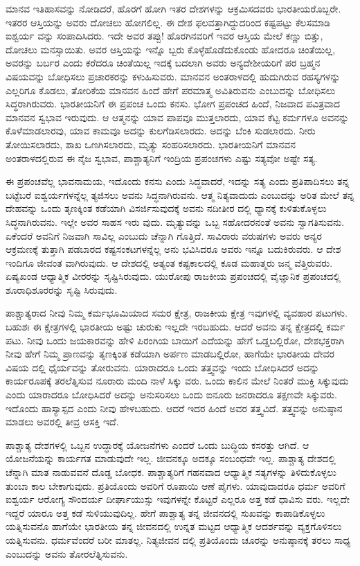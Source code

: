 ಮಾನವ ಇತಿಹಾಸವನ್ನು ನೋಡಿದರೆ, ಹೊರಗೆ ಹೋಗಿ ಇತರ ದೇಶಗಳನ್ನು ಆಕ್ರಮಿಸದವರು ಭಾರತೀಯರೊಬ್ಬರೇ. ಇತರರ ಆಸ್ತಿಯನ್ನು ಅವರು ದೋಚಲು ಹೋಗಲಿಲ್ಲ. ಈ ದೇಶ ಫಲವತ್ತಾಗಿದ್ದುದರಿಂದ ಕಷ್ಟಪಟ್ಟು ಕೆಲಸಮಾಡಿ ಐಶ್ವರ್ಯ ವನ್ನು ಸಂಪಾದಿಸಿದರು. ಇದೇ ಅವರ ತಪ್ಪು! ಹೊರಗಿನವರಿಗೆ ಇವರ ಆಸ್ತಿಯ ಮೇಲೆ ಕಣ್ಣು ಬಿತ್ತು, ದೋಚಲು ಮನಸ್ಸಾಯಿತು. ಅವರ ಆಸ್ತಿಯನ್ನು ಇನ್ನೊ ಬ್ಬರು ಕೊಳ್ಳೆಹೊಡೆದುಕೊಂಡು ಹೋದರೂ ಚಿಂತೆಯಿಲ್ಲ, ಅವರನ್ನು ಬರ್ಬರ ಎಂದು ಕರೆದರೂ ಚಿಂತೆಯಿಲ್ಲ ಇದಕ್ಕೆ ಬದಲಾಗಿ ಅವರು ಅನ್ಯದೇಶೀಯರಿಗೆ ಪರ ಬ್ರಹ್ಮನ ವಿಷಯವನ್ನು ಬೋಧಿಸಲು ಪ್ರಚಾರಕರನ್ನು ಕಳುಹಿಸುವರು. ಮಾನವನ ಅಂತರಾಳದಲ್ಲಿ ಹುದುಗಿರುವ ರಹಸ್ಯಗಳನ್ನು ಎಲ್ಲರಿಗೂ ಕೊಡಲು, ತೋರಿಕೆಯ ಮಾನವನ ಹಿಂದೆ ಹೇಗೆ ಪರಮಾತ್ಮ ಅವಿತಿರುವನು ಎಂಬುದನ್ನು ಬೋಧಿಸಲು ಸಿದ್ಧರಾಗಿರುವರು. ಭಾರತೀಯನಿಗೆ ಈ ಪ್ರಪಂಚ ಒಂದು ಕನಸು. ಭೋಗ ಪ್ರಪಂಚದ ಹಿಂದೆ, ನಿಜವಾದ ಪವಿತ್ರವಾದ ಮಾನವನ ಸ್ವಭಾವ ಇರುವುದು. ಆ ಆತ್ಮನನ್ನು ಯಾವ ಪಾಪವೂ ಮುತ್ತಲಾರದು, ಯಾವ ಕೆಟ್ಟ ಕರ್ಮಗಳೂ ಅವನನ್ನು ಕೊಳೆಮಾಡಲಾರವು, ಯಾವ ಕಾಮವೂ ಅದನ್ನು ಕುಲಗೆಡಿಸಲಾರದು. ಅದನ್ನು ಬೆಂಕಿ ಸುಡಲಾರದು. ನೀರು ತೋಯಿಸಲಾರದು, ಶಾಖ ಒಣಗಿಸಲಾರದು, ಮೃತ್ಯು ಸಂಹರಿಸಲಾರದು. ಭಾರತೀಯನಿಗೆ ಮಾನವನ ಅಂತರಾಳದಲ್ಲಿರುವ ಈ ನೈಜ ಸ್ವಭಾವ, ಪಾಶ್ಚಾತ್ಯನಿಗೆ ಇಂದ್ರಿಯ ಪ್ರಪಂಚಗಳು ಎಷ್ಟು ಸತ್ಯವೋ ಅಷ್ಟೇ ಸತ್ಯ.

ಈ ಪ್ರಪಂಚವೆಲ್ಲ ಭಾವನಾಮಯ, ಇದೊಂದು ಕನಸು ಎಂದು ಸಿದ್ಧವಾದರೆ, ಇದನ್ನು ಸತ್ಯ ಎಂದು ಪ್ರತಿಪಾದಿಸಲು ತನ್ನ ಬಟ್ಟೆಬರೆ ಐಶ್ವರ್ಯಗಳನ್ನೆಲ್ಲ ತ್ಯಜಿಸಲು ಅವನು ಸಿದ್ಧನಾಗಿರುವನು. ಆತ್ಮ ನಿತ್ಯವಾದುದು ಎಂಬುದನ್ನು ಅರಿತ ಮೇಲೆ ತನ್ನ ದೇಹವನ್ನು ಒಂದು ತೃಣಕ್ಕಿಂತ ಕಡೆಯಾಗಿ ವಿಸರ್ಜಿಸುವುದಕ್ಕೆ ಅವನು ನದೀತೀರ ದಲ್ಲಿ ಧ್ಯಾನಕ್ಕೆ ಕುಳಿತುಕೊಳ್ಳಲು ಸಿದ್ಧನಾಗಿರುವನು. ಇಲ್ಲೇ ಅವರ ಸಾಹಸ ಇರು ವುದು. ಮೃತ್ಯುವನ್ನು ಒಬ್ಬ ಸಹೋದರನಂತೆ ಅವನು ಸ್ವಾಗತಿಸುವನು. ಏಕೆಂದರೆ ಅವನಿಗೆ ನಿಜವಾಗಿ ಸಾವಿಲ್ಲ ಎಂಬುದು ಚೆನ್ನಾಗಿ ಗೊತ್ತಿದೆ. ಸಾವಿರಾರು ವರುಷಗಳು ಅವರು ಅನ್ಯರ ಆಕ್ರಮಣಕ್ಕೆ ತುತ್ತಾಗಿ ಪಡಬಾರದ ಕಷ್ಟಸಂಕಟಗಳನ್ನೆಲ್ಲ ಅನು ಭವಿಸಿದರೂ ಅವರು ಇನ್ನೂ ಬದುಕಿರುವರು. ಆ ದೇಶ ಇಂದಿಗೂ ಜೀವಂತ ವಾಗಿರುವುದು. ಆ ದೇಶದಲ್ಲಿ ಅತ್ಯಂತ ಕಷ್ಟಕಾಲದಲ್ಲಿ ಕೂಡ ಮಹಾತ್ಮರು ಜನ್ಮ ವೆತ್ತಿರುವರು. ಏಷ್ಯಖಂಡ ಆಧ್ಯಾತ್ಮಿಕ ವೀರರನ್ನು ಸೃಷ್ಟಿಸಿರುವುದು. ಯುರೋಪು ರಾಜಕೀಯ ಪ್ರಪಂಚದಲ್ಲಿ ವೈಜ್ಞಾನಿಕ ಪ್ರಪಂಚದಲ್ಲಿ ಶೂರಾಧಿಶೂರರನ್ನು ಸೃಷ್ಟಿ ಸಿರುವುದು.

ಪಾಶ್ಚಾತ್ಯರಾದ ನೀವು ನಿಮ್ಮ ಕರ್ಮಭೂಮಿಯಾದ ಸಮರ ಕ್ಷೇತ್ರ, ರಾಜಕೀಯ ಕ್ಷೇತ್ರ ಇವುಗಳಲ್ಲಿ ವ್ಯವಹಾರ ಪಟುಗಳು. ಬಹುಶಃ ಈ ಕ್ಷೇತ್ರಗಳಲ್ಲಿ ಭಾರತೀಯ ಅಷ್ಟು ಚುರುಕು ಇಲ್ಲದೇ ಇರಬಹುದು. ಆದರೆ ಅವನು ತನ್ನ ಕ್ಷೇತ್ರದಲ್ಲಿ ಕರ್ಮ ಪಟು. ನೀವು ಒಂದು ಜಯಕಾರವನ್ನು ಹೇಳಿ ಪಿರಂಗಿಯ ಬಾಯಿಗೆ ಎದೆಯನ್ನು ಹೇಗೆ ಒಡ್ಡಬಲ್ಲಿರೋ, ದೇಶಭಕ್ತರಾಗಿ ನೀವು ಹೇಗೆ ನಿಮ್ಮ ಪ್ರಾಣವನ್ನು ತೃಣಕ್ಕಿಂತ ಕಡೆಯಾಗಿ ಅರ್ಪಣ ಮಾಡಬಲ್ಲಿರೋ, ಹಾಗೆಯೇ ಭಾರತೀಯ ದೇವರ ವಿಷಯ ದಲ್ಲಿ ಧೈರ್ಯವನ್ನು ತೋರುವನು. ಯಾರಾದರೂ ಒಂದು ತತ್ತ್ವವನ್ನು ಇಂದು ಬೋಧಿಸಿದರೆ ಅದನ್ನು ಕಾರ್ಯರೂಪಕ್ಕೆ ತರಲೆತ್ನಿಸುವ ನೂರಾರು ಮಂದಿ ನಾಳೆ ಸಿಕ್ಕು ವರು. ಒಂದು ಕಾಲಿನ ಮೇಲೆ ನಿಂತರೆ ಮುಕ್ತಿ ಸಿಕ್ಕುವುದು ಎಂದು ಯಾರಾದರೂ ಬೋಧಿಸಿದರೆ ಅದನ್ನು ಅನುಸರಿಸಲು ಒಂದು ಐನೂರು ಜನರಾದರೂ ತಕ್ಷಣವೇ ಸಿಕ್ಕುವರು. ಇದೊಂದು ಹಾಸ್ಯಾಸ್ಪದ ಎಂದು ನೀವು ಹೇಳಬಹುದು. ಆದರೆ ಇದರ ಹಿಂದೆ ಅವರ ತತ್ತ್ವವಿದೆ. ತತ್ತ್ವವನ್ನು ಅನುಷ್ಠಾನ ಮಾಡಲು ಅವರಲ್ಲಿ ತೀವ್ರ ಆಸಕ್ತಿ ಇದೆ.

ಪಾಶ್ಚಾತ್ಯ ದೇಶಗಳಲ್ಲಿ ಒಬ್ಬನ ಉದ್ಧಾರಕ್ಕೆ ಯೋಜನೆಗಳು ಎಂದರೆ ಒಂದು ಬುದ್ಧಿಯ ಕಸರತ್ತು ಆಗಿದೆ. ಆ ಯೋಜನೆಯನ್ನು ಕಾರ್ಯಗತ ಮಾಡುವುದೇ ಇಲ್ಲ. ಜೀವನಕ್ಕೂ ಅದಕ್ಕೂ ಸಂಬಂಧವೇ ಇಲ್ಲ. ಪಾಶ್ಚಾತ್ಯ ದೇಶದಲ್ಲಿ ಚೆನ್ನಾಗಿ ಮಾತ ನಾಡುವವನೆ ದೊಡ್ಡ ಬೋಧಕ. ಪಾಶ್ಚಾತ್ಯರಿಗೆ ಗಹನವಾದ ಆಧ್ಯಾತ್ಮಿಕ ಸತ್ಯಗಳನ್ನು ತಿಳಿದುಕೊಳ್ಳಲು ತುಂಬಾ ಕಾಲ ಬೇಕಾಗುವುದು. ಪ್ರತಿಯೊಂದು ಅವರಿಗೆ ರೂಪಾಯಿ ಆಣೆ ಪೈಗಳು. ಯಾವುದಾದರೂ ಧರ್ಮ ಅವರಿಗೆ ಐಶ್ವರ್ಯ ಆರೋಗ್ಯ ಸೌಂದರ್ಯ ದೀರ್ಘಾಯುಸ್ಸು ಇವುಗಳನ್ನೇ ಕೊಟ್ಟರೆ ಎಲ್ಲರೂ ಅತ್ತ ಕಡೆ ಧಾವಿಸು ವರು. ಇಲ್ಲದೇ ಇದ್ದರೆ ಯಾರೂ ಅತ್ತ ಕಡೆ ಸುಳಿಯುವುದಿಲ್ಲ. ಹೇಗೆ ಪಾಶ್ಚಾತ್ಯ ತನ್ನ ಜೀವನದಲ್ಲಿ ಸುಖವನ್ನು ಕಾಪಾಡಿಕೊಳ್ಳಲು ಯತ್ನಿಸುವನೊ ಹಾಗೆಯೇ ಭಾರತೀಯ ತನ್ನ ಜೀವನದಲ್ಲಿ ಉನ್ನತ ಮಟ್ಟದ ಆಧ್ಯಾತ್ಮಿಕ ಆದರ್ಶವನ್ನು ವ್ಯಕ್ತಗೊಳಿಸಲು ಯತ್ನಿಸುವನು. ಧರ್ಮವೆಂದರೆ ಬರೀ ಮಾತಲ್ಲ. ನಿತ್ಯಜೀವನ ದಲ್ಲಿ ಪ್ರತಿಯೊಂದು ಚೂರನ್ನು ಅನುಷ್ಠಾನಕ್ಕೆ ತರಲು ಸಾಧ್ಯ ಎಂಬುದನ್ನು ಅವನು ತೋರಲೆತ್ನಿಸುವನು.

